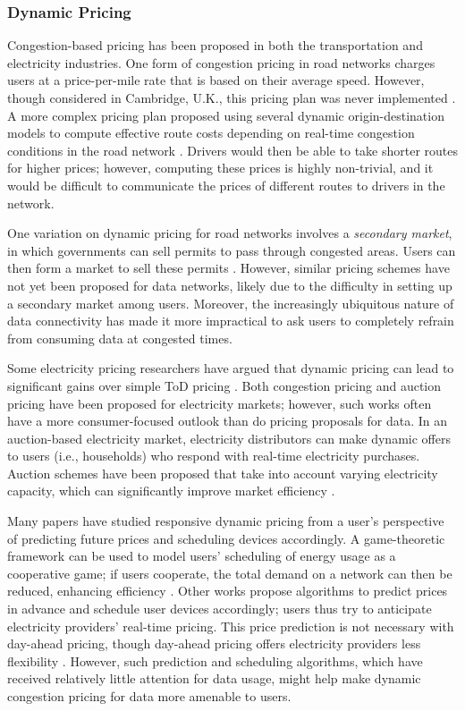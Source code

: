 \subsubsection{Dynamic Pricing}

Congestion-based pricing has been proposed in both the transportation and electricity industries. One form of congestion pricing in road networks charges users at a price-per-mile rate that is based on their average speed. However, though considered in Cambridge, U.K., this pricing plan was never implemented \cite{RoadPricing}. A more complex pricing plan proposed using several dynamic origin-destination models to compute effective route costs depending on real-time congestion conditions in the road network \cite{Joksimovic}. Drivers would then be able to take shorter routes for higher prices; however, computing these prices is highly non-trivial, and it would be difficult to communicate the prices of different routes to drivers in the network.

One variation on dynamic pricing for road networks involves a \emph{secondary market}, in which governments can sell permits to pass through congested areas. Users can then form a market to sell these permits \cite{starkie1986efficient}. However, similar pricing schemes have not yet been proposed for data networks, likely due to the difficulty in setting up a secondary market among users. Moreover, the increasingly ubiquitous nature of data connectivity has made it more impractical to ask users to completely refrain from consuming data at congested times.

Some electricity pricing researchers have argued that dynamic pricing can lead to significant gains over simple ToD pricing \cite{borenstein2005long}. Both congestion pricing and auction pricing have been proposed for electricity markets; however, such works often have a more consumer-focused outlook than do pricing proposals for data.
%
In an auction-based electricity market, electricity distributors can make dynamic offers to users (i.e., households) who respond with real-time electricity purchases.  Auction schemes have been proposed that take into account varying electricity capacity, which can significantly improve market efficiency \cite{vytelingum2010trading}.

Many papers have studied responsive dynamic pricing from a user's perspective of predicting future prices and scheduling devices accordingly.  A game-theoretic framework can be used to model users' scheduling of energy usage as a cooperative game; if users cooperate, the total demand on a network can then be reduced, enhancing efficiency \cite{caron2010incentive}. Other works propose algorithms to predict prices in advance \cite{Du,mohsenian2010optimalres} and schedule user devices accordingly; users thus try to anticipate electricity providers' real-time pricing. This price prediction is not necessary with day-ahead pricing, though day-ahead pricing offers electricity providers less flexibility \cite{joe2012optimized}. However, such prediction and scheduling algorithms, which have received relatively little attention for data usage, might help make dynamic congestion pricing for data more amenable to users.

